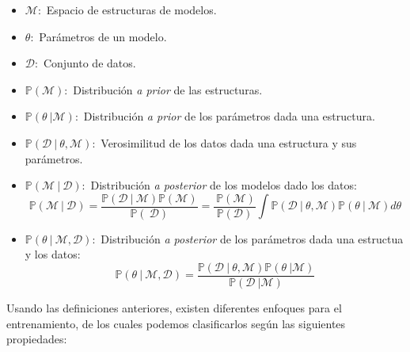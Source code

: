 \begin{itemize}
	\item $\mathcal{M}:$ Espacio de estructuras de modelos.
	
	\item $\theta :$ Parámetros de un modelo.
	
	\item $\mathcal{D}:$ Conjunto de datos.
	
	\item $\mathbb{P}(\mathcal{M}):$ Distribución \emph{a prior} de las
	estructuras.
	
	\item $\mathbb{P}(\theta \ |\mathcal{M}):$ Distribución \emph{a prior }%
	de los parámetros dada una estructura.
	
	\item $\mathbb{P}(\mathcal{D}\ |\ \theta ,\mathcal{M}):$ Verosimilitud de
	los datos dada una estructura y sus parámetros.
	
	\item $\mathbb{P}(\mathcal{M}\ |\ \mathcal{D}):$ Distribución \emph{a
		posterior} de los modelos dado los datos:%
	\begin{equation*}
	\mathbb{P}(\mathcal{M}\ |\ \mathcal{D})=\frac{\mathbb{P}(\mathcal{D}\ |\ 
		\mathcal{M})\mathbb{P}(\mathcal{M})}{\mathbb{P}(\ \mathcal{D})}=\frac{\ 
		\mathbb{P}(\mathcal{M})}{\mathbb{P}(\mathcal{D})}\int \mathbb{P}(\mathcal{D}%
	\ |\ \theta ,\mathcal{M})\mathbb{P}(\theta \ |\ \mathcal{M})d\theta
	\end{equation*}
	
	\item $\mathbb{P}(\theta \ |\ \mathcal{M},\mathcal{D}):$ Distribución 
	\emph{a posterior} de los parámetros dada una estructua y los datos:%
	\begin{equation*}
	\mathbb{P}(\theta \ |\ \mathcal{M},\mathcal{D})=\frac{\mathbb{P}(\mathcal{D}%
		\ |\ \theta ,\mathcal{M})\mathbb{P}(\theta \ |\mathcal{M})}{\mathbb{P}(%
		\mathcal{D}\ |\mathcal{M})}
	\end{equation*}
\end{itemize}

Usando las definiciones anteriores, existen diferentes enfoques para el entrenamiento, de los cuales podemos clasificarlos según las siguientes propiedades:

